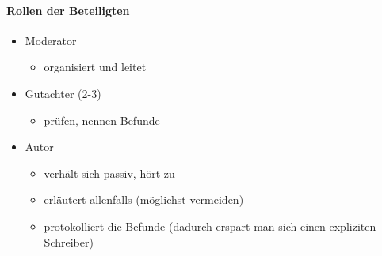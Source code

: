 \paragraph{Rollen der Beteiligten}
\begin{itemize}
    \item Moderator
        \begin{itemize}
            \item organisiert und leitet
        \end{itemize}
    \item Gutachter (2-3)
        \begin{itemize}
            \item prüfen, nennen Befunde
        \end{itemize}
    \item Autor
        \begin{itemize}
            \item verhält sich passiv, hört zu
            \item erläutert allenfalls (möglichst vermeiden)
            \item protokolliert die Befunde (dadurch erspart man sich einen expliziten Schreiber)
        \end{itemize}
\end{itemize}